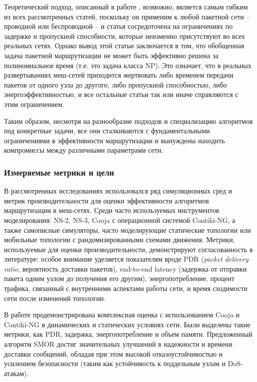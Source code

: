 \documentclass[%
]{report}
\begin{document}
Теоретический подход, описанный в работе
\textcite{DIIANNI1998131}, возможно, является самым гибким
из всех рассмотренных статей, поскольку он применим к
любой пакетной сети -- проводной или беспроводной -- и
статья сосредоточена на ограничениях по задержке
и пропускной способности, которые неизменно
присутствуют во всех реальных сетях.
Однако вывод этой статьи заключается в том,
что обобщенная задача пакетной маршрутизации не может быть
эффективно решена за полиномиальное время
(т.е. это задача класса NP).
Это означает, что в реальных развертываниях меш-сетей
приходится жертвовать либо временем передачи
пакетов от одного узла до другого,
либо пропускной способностью,
либо энергоэффективностью,
и все остальные статьи так или иначе справляются
с этим ограничением.

Таким образом, несмотря на разнообразие подходов
и специализацию алгоритмов под конкретные задачи,
все они сталкиваются с фундаментальными ограничениями
в эффективности маршрутизации и вынуждены находить
компромиссы между различными параметрами сети.

\subsubsection{Измеряемые метрики и цели}\label{evaluation-metrics-and-targets}


В рассмотренных исследованиях использовался
ряд симуляционных сред и метрик производительности
для оценки эффективности алгоритмов маршрутизации в меш-сетях.
Среди часто используемых инструментов моделирования:
NS-2, NS-3, Cooja с операционной системой Contiki-NG,
а также самописные симуляторы,
часто моделирующие статические топологии или
мобильные топологии с рандомизированными схемами движения.
Метрики, используемые для оценки производительности,
демонстрируют согласованность в литературе:
особое внимание уделяется показателям вроде
PDR (\emph{packet delivery ratio}, вероятность доставки пакетов),
end-to-end latency (задержка от отправки пакета одним узлом до получения его другим),
энергопотребление,
процент трафика, связанный с внутренними аспектами работы сети,
и время сходимости сети после изменений топологии.

В работе \textcite{KRENTZ202457} продемонстрирована
комплексная оценка с использованием
Cooja и Contiki-NG в динамических и статических условиях сети.
Были выделены такие метрики, как PDR,
задержка, энергопотребление и объем памяти.
Предложенный алгоритм SMOR достиг значительных
улучшений в надежности и времени доставки сообщений,
обладая при этом высокой отказоустойчивостью и усилением
безопасности (таким как устойчивость
к поддельным узлам и DoS-атакам).
\end{document}
